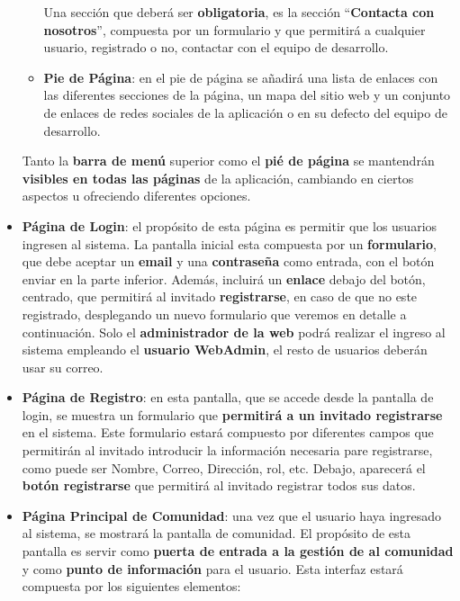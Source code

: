 \begin{appendices}
\begin{itemize}
\begin{itemize}
		Una sección que deberá ser \textbf{obligatoria}, es la sección ``\textbf{Contacta con nosotros}'', compuesta por un formulario y que permitirá a cualquier usuario, registrado o no, contactar con el equipo de desarrollo.
		
		\item \textbf{Pie de Página}: en el pie de página se añadirá una lista de enlaces con las diferentes secciones de la página, un mapa del sitio web y un conjunto de enlaces de redes sociales de la aplicación o en su defecto del equipo de desarrollo.
	\end{itemize}
	
	Tanto la \textbf{barra de menú} superior como el \textbf{pié de página} se mantendrán \textbf{visibles en todas las páginas} de la aplicación, cambiando en ciertos aspectos u ofreciendo diferentes opciones.
	
	\item \textbf{Página de Login}: el propósito de esta página es permitir que los usuarios ingresen al sistema. La pantalla inicial esta compuesta por un \textbf{formulario}, que debe aceptar un \textbf{email} y una \textbf{contraseña} como entrada, con el botón enviar en la parte inferior. Además, incluirá un \textbf{enlace} debajo del botón, centrado, que permitirá al invitado \textbf{registrarse}, en caso de que no este registrado, desplegando un nuevo formulario que veremos en detalle a continuación. Solo el \textbf{administrador de la web} podrá realizar el ingreso al sistema empleando el \textbf{usuario WebAdmin}, el resto de usuarios deberán usar su correo.
	
	\item \textbf{Página de Registro}: en esta pantalla, que se accede desde la pantalla de login, se muestra un formulario que \textbf{permitirá a un invitado registrarse} en el sistema. Este formulario estará compuesto por diferentes campos que permitirán al invitado introducir la información necesaria pare registrarse, como puede ser Nombre, Correo, Dirección, rol, etc. Debajo, aparecerá el \textbf{botón registrarse} que permitirá al invitado registrar todos sus datos.  

	
	\item \textbf{Página Principal de Comunidad}: una vez que el usuario haya ingresado al sistema, se mostrará la pantalla de comunidad. El propósito de esta pantalla es servir como \textbf{puerta de entrada a la gestión de al comunidad} y como \textbf{punto de información} para el usuario. Esta interfaz estará compuesta por los siguientes elementos:
	

\end{itemize}
\end{appendices}
